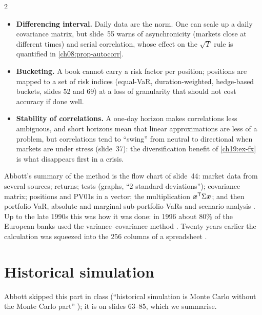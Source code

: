 \begin{paracol}{2}
\begin{itemize}
  \item \textbf{Differencing interval.} Daily data are the norm. One can scale up a daily covariance matrix, but slide~55 warns of asynchronicity (markets close at different times) and serial correlation, whose effect on the $\sqrt T$ rule is quantified in \cref{ch08:prop-autocorr}.
  \item \textbf{Bucketing.} A book cannot carry a risk factor per position; positions are mapped to a set of risk indices (equal-VaR, duration-weighted, hedge-based buckets, slides 52 and 69) at a loss of granularity that should not cost accuracy if done well.
  \item \textbf{Stability of correlations.} A one-day horizon makes correlations less ambiguous, and short horizons mean that linear approximations are less of a problem, but correlations tend to ``swing'' from neutral to directional when markets are under stress (slide~37): the diversification benefit of \cref{ch19:ex-fx} is what disappears first in a crisis.
\end{itemize}
Abbott's summary of the method is the flow chart of slide~44: market data from several sources; returns; tests (graphs, ``$2$ standard deviations''); covariance matrix; positions and PV01s in a vector; the multiplication $\bm x^{\mathsf T}\Sigma\bm x$; and then portfolio VaR, absolute and marginal sub-portfolio VaRs and scenario analysis . Up to the late 1990s this was how it was done: in 1996 about $80\%$ of the European banks used the variance--covariance method . Twenty years earlier the calculation was squeezed into the $256$ columns of a spreadsheet .

\section{Historical simulation}\label{ch19:sec-hs}
Abbott skipped this part in class (``historical simulation is Monte Carlo without the Monte Carlo part'' ); it is on slides 63--85, which we summarise.


\end{paracol}

